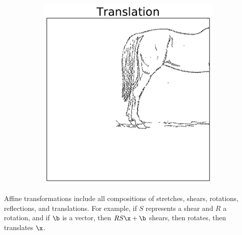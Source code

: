 \begin{figure}[H]
\begin{subfigure}{.32\textwidth}
    \includegraphics[width=\linewidth]{figures/TranslationHorse.pdf}
\end{subfigure}
\end{figure}

Affine transformations include all compositions of stretches, shears, rotations, reflections, and translations.
For example, if $S$ represents a shear and $R$ a rotation, and if $\b$ is a vector, then $RS\x + \b$ shears, then rotates, then translates $\x$.

\newpage %

